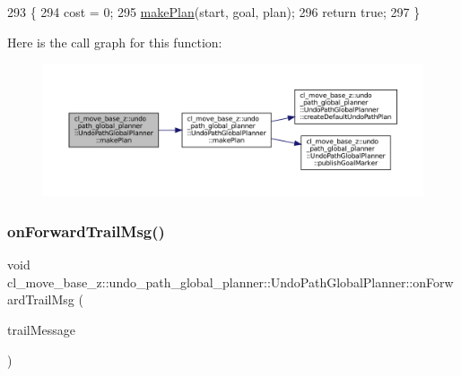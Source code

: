 \begin{DoxyCode}
293         \{
294             cost = 0;
295             \hyperlink{classcl__move__base__z_1_1undo__path__global__planner_1_1UndoPathGlobalPlanner_a46034d27c0811abae440009457a7f8b0}{makePlan}(start, goal, plan);
296             \textcolor{keywordflow}{return} \textcolor{keyword}{true};
297         \}
\end{DoxyCode}
Here is the call graph for this function\+:
\nopagebreak
\begin{figure}[H]
\begin{center}
\leavevmode
\includegraphics[width=350pt]{classcl__move__base__z_1_1undo__path__global__planner_1_1UndoPathGlobalPlanner_aca09f640e4bda4d5ccc9613276fd3f71_cgraph}
\end{center}
\end{figure}
\mbox{\label{classcl__move__base__z_1_1undo__path__global__planner_1_1UndoPathGlobalPlanner_ae5e3c5922ceb8783a6a01d904fc9c230}} 
\subsubsection{\texorpdfstring{on\+Forward\+Trail\+Msg()}{onForwardTrailMsg()}}
{\footnotesize\ttfamily void cl\+\_\+move\+\_\+base\+\_\+z\+::undo\+\_\+path\+\_\+global\+\_\+planner\+::\+Undo\+Path\+Global\+Planner\+::on\+Forward\+Trail\+Msg (\begin{DoxyParamCaption}\item[{const nav\+\_\+msgs\+::\+Path\+::\+Const\+Ptr \&}]{trail\+Message }\end{DoxyParamCaption})\hspace{0.3cm}{\ttfamily [private]}}

